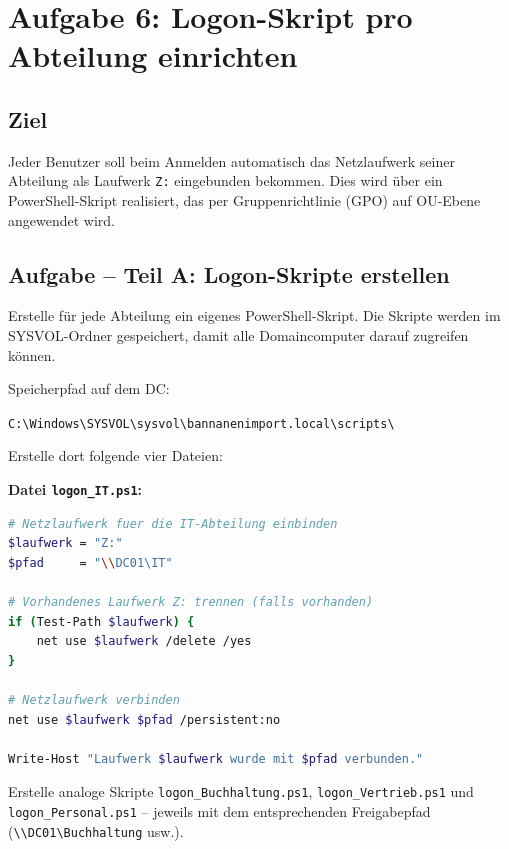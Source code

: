 \documentclass[11pt, oneside, numbers=noenddot]{scrbook}
\begin{document}
\newpage

\section{Aufgabe 6: Logon-Skript pro Abteilung einrichten}

\subsection*{Ziel}
Jeder Benutzer soll beim Anmelden automatisch das Netzlaufwerk seiner Abteilung als Laufwerk \texttt{Z:} eingebunden bekommen. Dies wird über ein PowerShell-Skript realisiert, das per Gruppenrichtlinie (GPO) auf OU-Ebene angewendet wird.

\subsection*{Aufgabe -- Teil A: Logon-Skripte erstellen}

Erstelle für jede Abteilung ein eigenes PowerShell-Skript. Die Skripte werden im SYSVOL-Ordner gespeichert, damit alle Domaincomputer darauf zugreifen können.

Speicherpfad auf dem DC:
\begin{center}
\texttt{C:\textbackslash Windows\textbackslash SYSVOL\textbackslash sysvol\textbackslash bannanenimport.local\textbackslash scripts\textbackslash}
\end{center}

Erstelle dort folgende vier Dateien:

\textbf{Datei \texttt{logon\_IT.ps1}:}
\begin{lstlisting}[language=sh, caption=Logon-Skript IT-Abteilung]
# Netzlaufwerk fuer die IT-Abteilung einbinden
$laufwerk = "Z:"
$pfad     = "\\DC01\IT"

# Vorhandenes Laufwerk Z: trennen (falls vorhanden)
if (Test-Path $laufwerk) {
    net use $laufwerk /delete /yes
}

# Netzlaufwerk verbinden
net use $laufwerk $pfad /persistent:no

Write-Host "Laufwerk $laufwerk wurde mit $pfad verbunden."
\end{lstlisting}

  Erstelle analoge Skripte \texttt{logon\_Buch\allowbreak haltung.ps1}, \texttt{logon\_Vertrieb.ps1} und \texttt{logon\_Personal.ps1} -- jeweils mit dem entsprechenden Freigabepfad (\texttt{\textbackslash\textbackslash DC01\textbackslash Buchhaltung} usw.).
\end{document}
